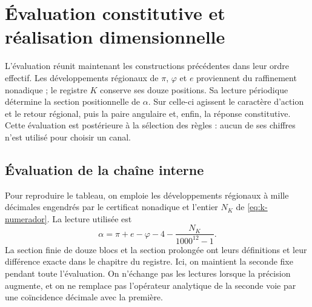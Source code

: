 \section{Évaluation constitutive et réalisation dimensionnelle}
\label{iii:sec:evaluacion}

L’évaluation réunit maintenant les constructions précédentes dans leur ordre effectif.
Les développements régionaux de $\pi$, $\varphi$ et $e$ proviennent du raffinement
nonadique ; le registre $K$ conserve ses douze positions. Sa lecture périodique
détermine la section positionnelle de $\alpha$. Sur celle-ci agissent le caractère
d’action et le retour régional, puis la paire angulaire et, enfin, la
réponse constitutive. Cette évaluation est postérieure à la sélection des
règles : aucun de ses chiffres n’est utilisé pour choisir un canal.

\subsection{Évaluation de la chaîne interne}

Pour reproduire le tableau, on emploie les développements régionaux à mille
décimales engendrés par le certificat nonadique et l’entier $N_K$ de
\eqref{eq:k-numerador}. La lecture utilisée est
\[
 \alpha=\pi+e-\varphi-4-\frac{N_K}{1000^{12}-1}.
\]
La section finie de douze blocs et la section prolongée ont leurs
définitions et leur différence exacte dans le chapitre du registre. Ici, on
maintient la seconde fixe pendant toute l’évaluation. On n’échange pas
les lectures lorsque la précision augmente, et on ne remplace pas l’opérateur analytique
de la seconde voie par une coïncidence décimale avec la première.

